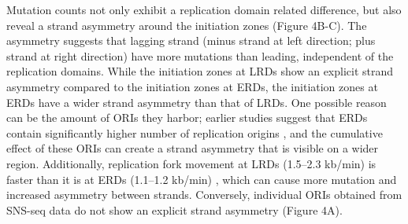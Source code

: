 Mutation counts not only exhibit a replication domain related difference, but also reveal a strand asymmetry around the initiation zones (Figure 4B-C). The asymmetry suggests that lagging strand (minus strand at left direction; plus strand at right direction) have more mutations than leading, independent of the replication domains. While the initiation zones at LRDs show an explicit strand asymmetry compared to the initiation zones at ERDs, the initiation zones at ERDs have a wider strand asymmetry than that of LRDs. One possible reason can be the amount of ORIs they harbor; earlier studies suggest that ERDs contain significantly higher number of replication origins \citep{besnard2012unraveling}, and the cumulative effect of these ORIs can create a strand asymmetry that is visible on a wider region. Additionally, replication fork movement at LRDs (1.5–2.3 kb/min) is faster than it is at ERDs (1.1–1.2 kb/min) \citep{takebayashi2005regulation}, which can cause more mutation and increased asymmetry between strands. Conversely, individual ORIs obtained from SNS-seq data do not show an explicit strand asymmetry (Figure 4A).

